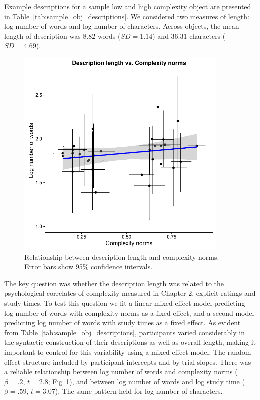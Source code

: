 Example descriptions for a sample low and high complexity object are presented in Table~\ref{tab:sample_obj_descriptions}. We considered two measures of length:  log number of words and log number of characters. Across objects, the mean length of description was  $8.82$ words ($SD = 1.14$) and $36.31$ characters ($SD = 4.69$).

 \begin{figure}
 \begin{center}
  \includegraphics[width=4in]{figs/desc_length_word.pdf}
  \caption{\label{fig:desc_length} Relationship between description length and complexity norms. Error bars show  95\% confidence intervals.}
 \end{center}
\end{figure}


The key question was whether the description length was related to the psychological correlates of complexity measured in Chapter 2, explicit ratings and study times.
To test this question we fit a  linear mixed-effect model predicting log number of words with complexity norms as a fixed effect, and a second model predicting log number of words with study times as a fixed effect. As evident from Table~\ref{tab:sample_obj_descriptions}, participants varied considerably in the  syntactic construction of their descriptions as well as overall  length, making it important to control for this variability using a  mixed-effect model. The random effect structure included by-participant intercepts and by-trial slopes. There was a reliable relationship between log number of words and  complexity norms ($\beta=.2$, $t =2.8$; Fig~\ref{fig:desc_length}), and between log number of words and log study time ($\beta=.59$, $t =3.07$). The same pattern held for log number of characters. 

